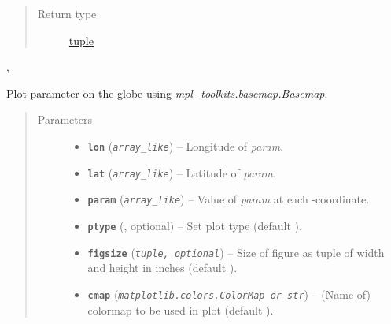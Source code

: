 \documentclass[letterpaper,10pt,english]{sphinxhowto}
\begin{document}
\begin{fulllineitems}
\begin{quote}
\begin{description}
\item[{Return type}] \leavevmode
\href{https://docs.python.org/library/functions.html\#tuple}{tuple}

\end{description}\end{quote}




{\hyperref[swtools_doc:swtools.plot_twinx]{\emph{}}}, {\hyperref[swtools_doc:swtools.plot_align]{\emph{}}}



\end{fulllineitems}


\begin{fulllineitems}
\label{swtools_doc:swtools.plot_geo}
Plot parameter on the globe using \emph{mpl\_toolkits.basemap.Basemap}.
\begin{quote}\begin{description}
\item[{Parameters}] \leavevmode\begin{itemize}
\item {} 
\textbf{\texttt{lon}} (\emph{\texttt{array\_like}}) -- Longitude of \emph{param}.

\item {} 
\textbf{\texttt{lat}} (\emph{\texttt{array\_like}}) -- Latitude of \emph{param}.

\item {} 
\textbf{\texttt{param}} (\emph{\texttt{array\_like}}) -- Value of \emph{param} at each -coordinate.

\item {} 
\textbf{\texttt{ptype}} (, optional) -- Set plot type (default ).

\item {} 
\textbf{\texttt{figsize}} (\emph{\texttt{tuple, optional}}) -- Size of figure as tuple of width and height in inches
(default ).

\item {} 
\textbf{\texttt{cmap}} (\emph{\texttt{matplotlib.colors.ColorMap or str}}) -- (Name of) colormap to be used in plot
(default ).


\end{itemize}
\end{description}
\end{quote}
\end{fulllineitems}
\end{document}
